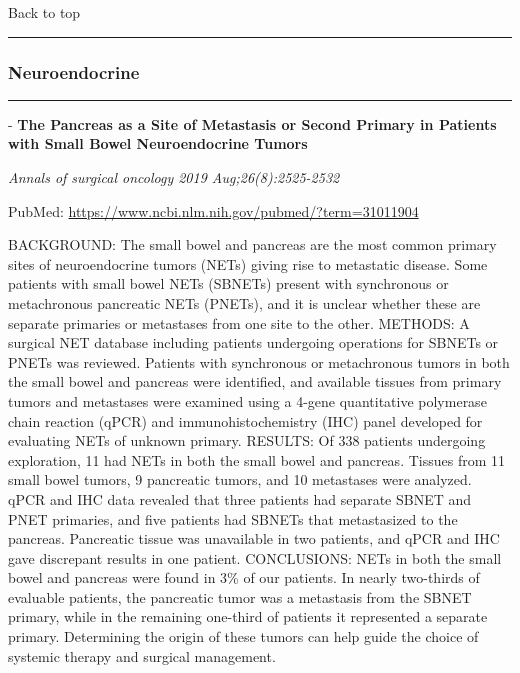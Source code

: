 \documentclass[]{article}
\begin{document}
Back to top

\begin{center}\rule{0.5\linewidth}{\linethickness}\end{center}

\pagebreak

\hypertarget{neuroendocrine-2}{%
\subsubsection{Neuroendocrine}\label{neuroendocrine-2}}

\begin{center}\rule{0.5\linewidth}{\linethickness}\end{center}

 - \textbf{The Pancreas as a Site of Metastasis or Second Primary in
Patients with Small Bowel Neuroendocrine Tumors}

\emph{Annals of surgical oncology 2019 Aug;26(8):2525-2532}

PubMed: \url{https://www.ncbi.nlm.nih.gov/pubmed/?term=31011904}

BACKGROUND: The small bowel and pancreas are the most common primary
sites of neuroendocrine tumors (NETs) giving rise to metastatic disease.
Some patients with small bowel NETs (SBNETs) present with synchronous or
metachronous pancreatic NETs (PNETs), and it is unclear whether these
are separate primaries or metastases from one site to the other.
METHODS: A surgical NET database including patients undergoing
operations for SBNETs or PNETs was reviewed. Patients with synchronous
or metachronous tumors in both the small bowel and pancreas were
identified, and available tissues from primary tumors and metastases
were examined using a 4-gene quantitative polymerase chain reaction
(qPCR) and immunohistochemistry (IHC) panel developed for evaluating
NETs of unknown primary. RESULTS: Of 338 patients undergoing
exploration, 11 had NETs in both the small bowel and pancreas. Tissues
from 11 small bowel tumors, 9 pancreatic tumors, and 10 metastases were
analyzed. qPCR and IHC data revealed that three patients had separate
SBNET and PNET primaries, and five patients had SBNETs that metastasized
to the pancreas. Pancreatic tissue was unavailable in two patients, and
qPCR and IHC gave discrepant results in one patient. CONCLUSIONS: NETs
in both the small bowel and pancreas were found in 3\% of our patients.
In nearly two-thirds of evaluable patients, the pancreatic tumor was a
metastasis from the SBNET primary, while in the remaining one-third of
patients it represented a separate primary. Determining the origin of
these tumors can help guide the choice of systemic therapy and surgical
management.
\end{document}
